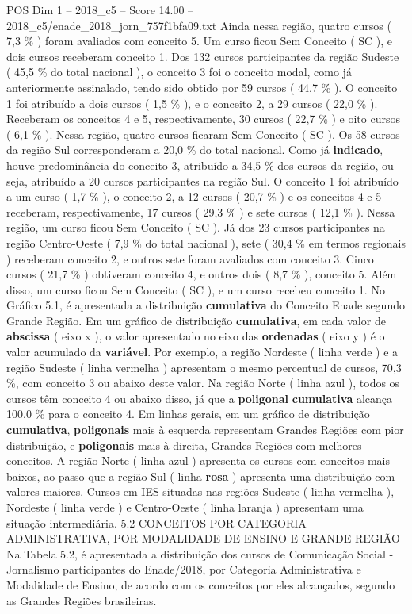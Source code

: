\begin{textsample}{POS Dim 1 – 2018\_c5 – Score 14.00 – 2018\_c5/enade\_2018\_jorn\_757f1bfa09.txt}
Ainda nessa região, quatro cursos ( 7,3 \% ) foram avaliados com conceito 5.
Um curso ficou Sem Conceito ( SC ), e dois cursos receberam conceito 1.
Dos 132 cursos participantes da região Sudeste ( 45,5 \% do total nacional ), o conceito 3 foi o conceito modal, como já anteriormente assinalado, tendo sido obtido por 59 cursos ( 44,7 \% ).
O conceito 1 foi atribuído a dois cursos ( 1,5 \% ), e o conceito 2, a 29 cursos ( 22,0 \% ).
Receberam os conceitos 4 e 5, respectivamente, 30 cursos ( 22,7 \% ) e oito cursos ( 6,1 \% ).
Nessa região, quatro cursos ficaram Sem Conceito ( SC ).
Os 58 cursos da região Sul corresponderam a 20,0 \% do total nacional.
Como já \textbf{indicado}, houve predominância do conceito 3, atribuído a 34,5 \% dos cursos da região, ou seja, atribuído a 20 cursos participantes na região Sul.
O conceito 1 foi atribuído a um curso ( 1,7 \% ), o conceito 2, a 12 cursos ( 20,7 \% ) e os conceitos 4 e 5 receberam, respectivamente, 17 cursos ( 29,3 \% ) e sete cursos ( 12,1 \% ).
Nessa região, um curso ficou Sem Conceito ( SC ).
Já dos 23 cursos participantes na região Centro-Oeste ( 7,9 \% do total nacional ), sete ( 30,4 \% em termos regionais ) receberam conceito 2, e outros sete foram avaliados com conceito 3.
Cinco cursos ( 21,7 \% ) obtiveram conceito 4, e outros dois ( 8,7 \% ), conceito 5.
Além disso, um curso ficou Sem Conceito ( SC ), e um curso recebeu conceito 1.
No Gráfico 5.1, é apresentada a distribuição \textbf{cumulativa} do Conceito Enade segundo Grande Região.
Em um gráfico de distribuição \textbf{cumulativa}, em cada valor de \textbf{abscissa} ( eixo x ), o valor apresentado no eixo das \textbf{ordenadas} ( eixo y ) é o valor acumulado da \textbf{variável}.
Por exemplo, a região Nordeste ( linha verde ) e a região Sudeste ( linha vermelha ) apresentam o mesmo percentual de cursos, 70,3 \%, com conceito 3 ou abaixo deste valor.
Na região Norte ( linha azul ), todos os cursos têm conceito 4 ou abaixo disso, já que a \textbf{poligonal} \textbf{cumulativa} alcança 100,0 \% para o conceito 4.
Em linhas gerais, em um gráfico de distribuição \textbf{cumulativa}, \textbf{poligonais} mais à esquerda representam Grandes Regiões com pior distribuição, e \textbf{poligonais} mais à direita, Grandes Regiões com melhores conceitos.
A região Norte ( linha azul ) apresenta os cursos com conceitos mais baixos, ao passo que a região Sul ( linha \textbf{rosa} ) apresenta uma distribuição com valores maiores.
Cursos em IES situadas nas regiões Sudeste ( linha vermelha ), Nordeste ( linha verde ) e Centro-Oeste ( linha laranja ) apresentam uma situação intermediária. 5.2 CONCEITOS POR CATEGORIA ADMINISTRATIVA, POR MODALIDADE DE ENSINO E GRANDE REGIÃO Na Tabela 5.2, é apresentada a distribuição dos cursos de Comunicação Social - Jornalismo participantes do Enade/2018, por Categoria Administrativa e Modalidade de Ensino, de acordo com os conceitos por eles alcançados, segundo as Grandes Regiões brasileiras.

\end{textsample}
